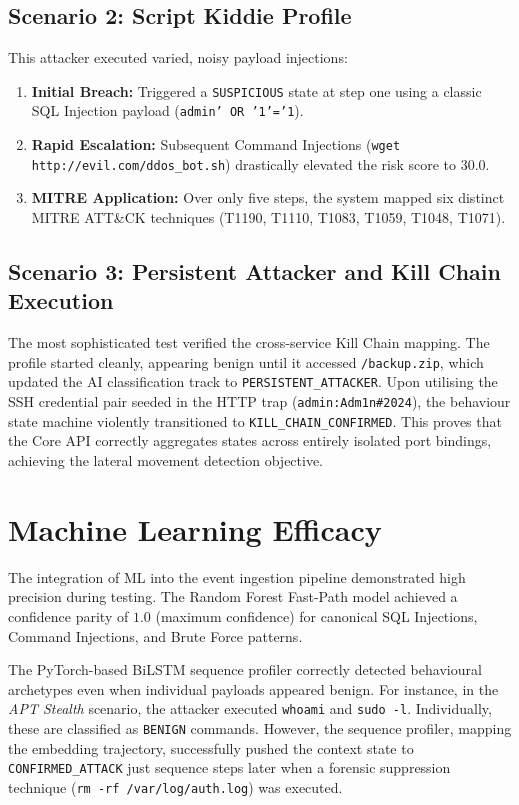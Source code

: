 \subsection{Scenario 2: Script Kiddie Profile}
This attacker executed varied, noisy payload injections:
\begin{enumerate}
    \item \textbf{Initial Breach:} Triggered a \texttt{SUSPICIOUS} state at step one using a classic SQL Injection payload (\texttt{admin' OR '1'='1}).
    \item \textbf{Rapid Escalation:} Subsequent Command Injections (\texttt{wget http://evil.com/ddos\_bot.sh}) drastically elevated the risk score to $30.0$.
    \item \textbf{MITRE Application:} Over only five steps, the system mapped six distinct MITRE ATT\&CK techniques (T1190, T1110, T1083, T1059, T1048, T1071).
\end{enumerate}

\subsection{Scenario 3: Persistent Attacker and Kill Chain Execution}
The most sophisticated test verified the cross-service Kill Chain mapping. 
The profile started cleanly, appearing benign until it accessed \texttt{/backup.zip}, which updated the AI classification track to \texttt{PERSISTENT\_ATTACKER}. Upon utilising the SSH credential pair seeded in the HTTP trap (\texttt{admin:Adm1n\#2024}), the behaviour state machine violently transitioned to \texttt{KILL\_CHAIN\_CONFIRMED}. 
This proves that the Core API correctly aggregates states across entirely isolated port bindings, achieving the lateral movement detection objective.

\section{Machine Learning Efficacy}

The integration of ML into the event ingestion pipeline demonstrated high precision during testing. The Random Forest Fast-Path model achieved a confidence parity of $1.0$ (maximum confidence) for canonical SQL Injections, Command Injections, and Brute Force patterns.

The PyTorch-based BiLSTM sequence profiler correctly detected behavioural archetypes even when individual payloads appeared benign. For instance, in the \textit{APT Stealth} scenario, the attacker executed \texttt{whoami} and \texttt{sudo -l}. Individually, these are classified as \texttt{BENIGN} commands. However, the sequence profiler, mapping the embedding trajectory, successfully pushed the context state to \texttt{CONFIRMED\_ATTACK} just sequence steps later when a forensic suppression technique (\texttt{rm -rf /var/log/auth.log}) was executed.

